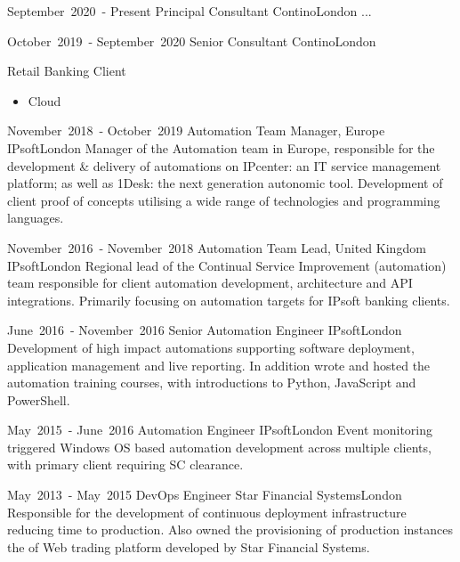 
\cventry %
  {\mbox{September 2020 -} \mbox{Present}}
  {Principal Consultant}
  {Contino}{London}{}
  { 
    ...
  }

\cventry %
  {\mbox{October 2019 -} \mbox{September 2020}}
  {Senior Consultant}
  {Contino}{London}{}
  {
    Retail Banking Client
    \begin{itemize}
      \item Cloud 
    \end{itemize}
  }

\cventry %
  {\mbox{November 2018 -} \mbox{October 2019}}
  {Automation Team Manager, Europe}
  {IPsoft}{London}{}
  {
    Manager of the Automation team in Europe, responsible for the 
    development \& delivery of automations on IPcenter: an IT service management 
    platform; as well as 1Desk: the next generation autonomic tool. 
    Development of client proof of concepts utilising a wide range of technologies and programming languages.\\
  }

\cventry %
  {\mbox{November 2016 -} \mbox{November 2018}}
  {Automation Team Lead, United Kingdom}
  {IPsoft}{London}{}
  {
    Regional lead of the Continual Service Improvement (automation) team responsible 
    for client automation development, architecture and API integrations. 
    Primarily focusing on automation targets for IPsoft banking clients.\\
  }

\cventry %
  {\mbox{June 2016 -} \mbox{November 2016}}
  {Senior Automation Engineer}
  {IPsoft}{London}{}
  {
    Development of high impact automations supporting software deployment, 
    application management and live reporting. In addition wrote and hosted 
    the automation training courses, with introductions to Python, JavaScript and PowerShell.\\
  }

\cventry %
  {\mbox{May 2015 -} \mbox{June 2016}}
  {Automation Engineer}
  {IPsoft}{London}{}
  {
    Event monitoring triggered Windows OS based automation development across 
    multiple clients, with primary client requiring SC clearance.\\
  }

\cventry %
  {\mbox{May 2013 -} \mbox{May 2015}}
  {DevOps Engineer}
  {Star Financial Systems}{London}{}
  {
    Responsible for the development of continuous deployment infrastructure 
    reducing time to production. Also owned the provisioning of production 
    instances the of Web trading platform developed by Star Financial Systems.\\
  }

